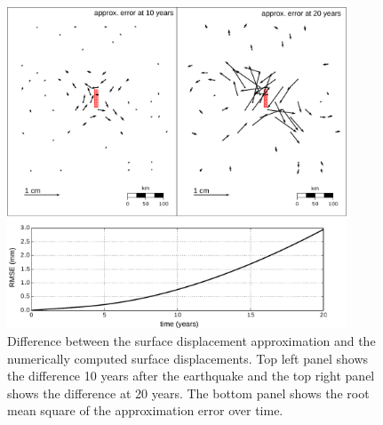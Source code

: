 \documentclass[fleqn,12pt]{article}
\begin{document}
\begin{figure}[h!]\label{figure6}
  \centering
  \includegraphics[width=0.9\textwidth]{FinalFigures/Figure7.pdf}
  \caption{Difference between the surface displacement approximation
    and the numerically computed surface displacements.  Top left
    panel shows the difference 10 years after the earthquake and the
    top right panel shows the difference at 20 years.  The bottom
    panel shows the root mean square of the approximation error over
    time.}
  \label{figure 6}
\end{figure}
\end{document}
